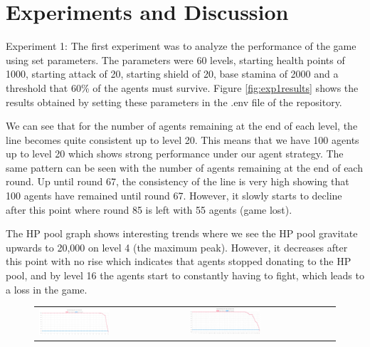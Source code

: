 \section{Experiments and Discussion}


Experiment 1:
The first experiment was to analyze the performance of the game using set parameters. The parameters were 60 levels, starting health points of 1000, starting attack of 20, starting shield of 20, base stamina of 2000 and a threshold that 60\% of the agents must survive.
Figure \ref{fig:exp1results} shows the results obtained by setting these parameters in the .env file of the repository. 

We can see that for the number of agents remaining at the end of each level, the line becomes quite consistent up to level 20. This means that we have 100 agents up to level 20 which shows strong performance under our agent strategy. The same pattern can be seen with the number of agents remaining at the end of each round. Up until round 67, the consistency of the line is very high showing that 100 agents have remained until round 67. However, it slowly starts to decline after this point where round 85 is left with 55 agents (game lost). 

The HP pool graph shows interesting trends where we see the HP pool gravitate upwards to 20,000 on level 4 (the maximum peak). However, it decreases after this point with no rise which indicates that agents stopped donating to the HP pool, and by level 16 the agents start to constantly having to fight, which leads to a loss in the game.

\newpage
\begin{figure}[htbp]
\begin{tabular}{ll}
    \centering
    \includegraphics[width=0.5\textwidth]{007_team_4_agent_design/figures/EX1_1.jpg}
    &
    \includegraphics[width=0.5\textwidth]{007_team_4_agent_design/figures/EX1_2.jpg}
\end{tabular}

\end{figure}

